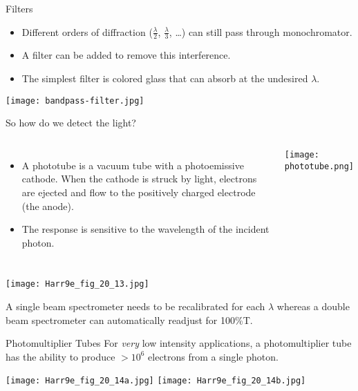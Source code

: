 \documentclass[handout]{beamer}
\begin{document}
\begin{frame}{Filters}
	\begin{itemize}
		\item Different orders of diffraction ($\frac{\lambda}{2}$,
			$\frac{\lambda}{3}$, \ldots) can still pass through
			monochromator.
		\item A \alert{filter} can be added to remove this interference.
		\item The simplest filter is colored glass that can absorb at
			the undesired $\lambda$.
	\end{itemize}

	\begin{center}
		\texttt{[image: bandpass-filter.jpg]}
	\end{center}
\end{frame}

\begin{frame}[allowframebreaks]{So how do we detect the light?}
	\begin{columns}
	\begin{itemize}
		\item A \alert{phototube} is a vacuum tube with a
			\alert{photoemissive cathode}. When the cathode is
			struck by light, electrons are ejected and flow to the
			positively charged electrode (the anode).
		\item The response is sensitive to the wavelength of the
			incident photon.
	\end{itemize}
		\texttt{[image: phototube.png]}
	\end{columns}

	\framebreak

	\texttt{[image: Harr9e\_fig\_20\_13.jpg]}

	A single beam spectrometer needs to be recalibrated for each $\lambda$
	whereas a double beam spectrometer can automatically readjust for
	100\%T.
\end{frame}

\begin{frame}{Photomultiplier Tubes}
	For \emph{very} low intensity applications, a \alert{photomultiplier
	tube} has the ability to produce $>10^6$ electrons from a single photon.

	\begin{center}
	\texttt{[image: Harr9e\_fig\_20\_14a.jpg]} \quad
	\texttt{[image: Harr9e\_fig\_20\_14b.jpg]}
	\end{center}
\end{frame}
\end{document}
